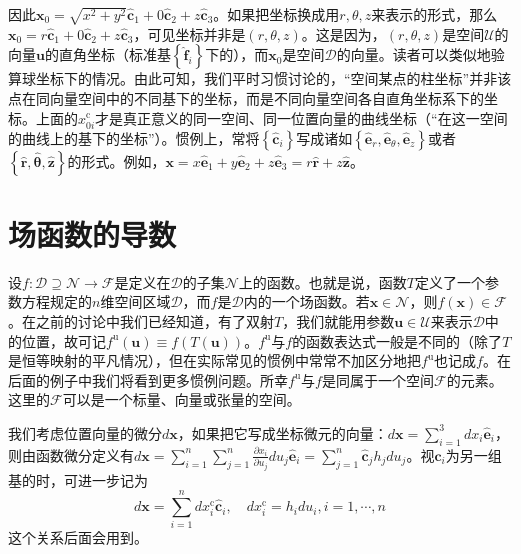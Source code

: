 \documentclass[main.tex]{subfiles}
\begin{document}
\begin{example}[柱坐标]
    因此$\mathbf{x}_0=\sqrt{x^2+y^2}\mathbf{\hat{c}}_1+0\mathbf{\hat{c}}_2+z\mathbf{\hat{c}}_3$。如果把坐标换成用$r,\theta,z$来表示的形式，那么$\mathbf{x}_0=r\mathbf{\hat{c}}_1+0\mathbf{\hat{c}}_2+z\mathbf{\hat{c}}_3$，可见坐标并非是$\left(r,\theta,z\right)$。这是因为，$\left(r,\theta,z\right)$是空间$\mathcal{U}$的向量$\mathbf{u}$的直角坐标（标准基$\left\{\mathbf{\hat{f}}_i\right\}$下的），而$\mathbf{x}_0$是空间$\mathcal{D}$的向量。读者可以类似地验算球坐标下的情况。由此可知，我们平时习惯讨论的，“空间某点的柱坐标”并非该点在同向量空间中的不同基下的坐标，而是不同向量空间各自直角坐标系下的坐标。上面的$x_{0i}^\mathrm{c}$才是真正意义的同一空间、同一位置向量的曲线坐标（“在这一空间的曲线上的基下的坐标”）。惯例上，常将$\left\{\mathbf{\hat{c}}_i\right\}$写成诸如$\left\{\mathbf{\hat{e}}_r,\mathbf{\hat{e}}_\theta,\mathbf{\hat{e}}_z\right\}$或者$\left\{\mathbf{\hat{r}},\hat{\boldsymbol{\theta}},\mathbf{\hat{z}}\right\}$的形式。例如，$\mathbf{x}=x\mathbf{\hat{e}}_1+y\mathbf{\hat{e}}_2+z\mathbf{\hat{e}}_3=r\mathbf{\hat{r}}+z\mathbf{\hat{z}}$。
\end{example}

\section{场函数的导数}
设$f:\mathcal{D}\supseteq\mathcal{N}\rightarrow\mathcal{F}$是定义在$\mathcal{D}$的子集$\mathcal{N}$上的函数。也就是说，函数$T$定义了一个参数方程规定的$n$维空间区域$\mathcal{D}$，而$f$是$\mathcal{D}$内的一个场函数。若$\mathbf{x}\in\mathcal{N}$，则$f\left(\mathbf{x}\right)\in\mathcal{F}$。在之前的讨论中我们已经知道，有了双射$T$，我们就能用参数$\mathbf{u}\in\mathcal{U}$来表示$\mathcal{D}$中的位置，故可记$f^\mathrm{u}\left(\mathbf{u}\right)\equiv f\left(T\left(\mathbf{u}\right)\right)$。$f^\mathrm{u}$与$f$的函数表达式一般是不同的（除了$T$是恒等映射的平凡情况），但在实际常见的惯例中常常不加区分地把$f^\mathrm{u}$也记成$f$。在后面的例子中我们将看到更多惯例问题。所幸$f^\mathrm{u}$与$f$是同属于一个空间$\mathcal{F}$的元素。这里的$\mathcal{F}$可以是一个标量、向量或张量的空间。

我们考虑位置向量的微分$d\mathbf{x}$，如果把它写成坐标微元的向量：$d\mathbf{x}=\sum_{i=1}^3dx_i\mathbf{\hat{e}}_i$，则由函数微分定义有$d\mathbf{x}=\sum_{i=1}^n\sum_{j=1}^n\frac{\partial x_i}{\partial u_j}du_j\mathbf{\hat{e}}_i=\sum_{j=1}^n\mathbf{\hat{c}}_jh_jdu_j$。视$\mathbf{\hat{c}}_i$为另一组基的时，可进一步记为
\[d\mathbf{x}=\sum_{i=1}^ndx_i^\mathrm{c}\mathbf{\hat{c}}_i,\quad dx_i^\mathrm{c}=h_idu_i,i=1,\cdots,n\]
这个关系后面会用到。
\end{document}
